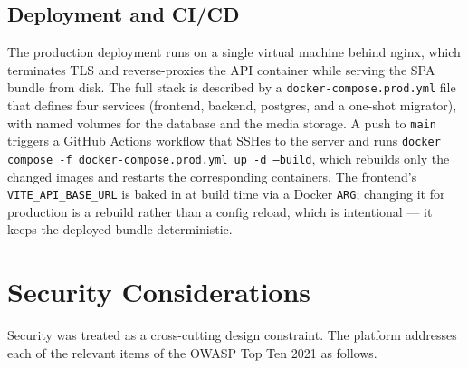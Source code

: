 \documentclass[12pt,a4paper]{report}
\begin{document}
\subsection{Deployment and CI/CD}

The production deployment runs on a single virtual machine behind nginx,
which terminates TLS and reverse-proxies the API container while serving
the SPA bundle from disk. The full stack is described by a
\texttt{docker-compose.prod.yml} file that defines four services
(frontend, backend, postgres, and a one-shot migrator), with named
volumes for the database and the media storage. A push to \texttt{main}
triggers a GitHub Actions workflow that SSHes to the server and runs
\texttt{docker compose -f docker-compose.prod.yml up -d --build}, which
rebuilds only the changed images and restarts the corresponding
containers. The frontend's \texttt{VITE\_API\_BASE\_URL} is baked in at
build time via a Docker \texttt{ARG}; changing it for production is a
rebuild rather than a config reload, which is intentional --- it keeps
the deployed bundle deterministic.

\section{Security Considerations}

Security was treated as a cross-cutting design constraint. The platform
addresses each of the relevant items of the OWASP Top Ten 2021
\cite{owasp2021} as follows.
\end{document}
